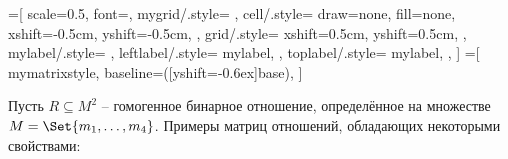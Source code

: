 \documentclass[a4paper,10pt]{article}
\begin{document}
\newcommand\drawlabelnorth[1]{%
    \node[above,align=center] at (current bounding box.north) {#1};
}
\newcommand\drawlabelsouth[1]{%
    \node[below,align=center] at (current bounding box.south) {#1};
}

=[
    scale=0.5,
    font=\small,
    mygrid/.style={
    },
    cell/.style={ %
        draw=none,
        fill=none,
        xshift=-0.5cm,
        yshift=-0.5cm,
    },
    grid/.style={ %
        xshift=0.5cm,
        yshift=0.5cm,
    },
    mylabel/.style={
    },
    leftlabel/.style={
        mylabel,
    },
    toplabel/.style={
        mylabel,
    },
]
=[
    mymatrixstyle,
    baseline={([yshift=-0.6ex]base)},
]

\def\matrixsize{4}

Пусть $R \subseteq M^2$ \--- гомогенное бинарное отношение, определённое на множестве $M = \Set{m_1, \dotsc, m_{\matrixsize}}$.
Примеры матриц отношений, обладающих некоторыми свойствами:
\end{document}
